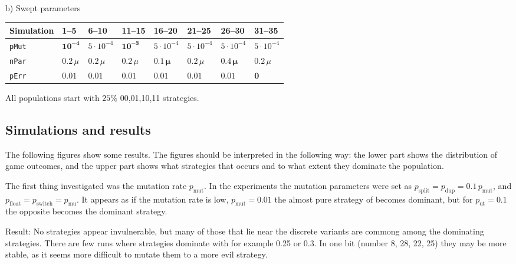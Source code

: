 \begin{table}[!hbtp]
  b) Swept parameters\myhalfpar

  \newcommand \temp {$5\cdot 10^{-4}$}
  \begin{tabular}{*{8}{l}}
    Simulation    & 1--5               & 6--10    & 11--15    & 16--20   & 21--25   & 26--30   & 31--35   \\
    \hline
    \texttt{pMut} & $\mathbf{10^{-4}}$ & \temp       & $\mathbf{10^{-3}}$ & \temp       & \temp       & \temp       & \temp       \\
    \texttt{nPar} & $0.2\,\mu$          & $0.2\,\mu$ & $0.2\,\mu$  & $\mathbf{0.1\,\mu}$ & $0.2\,\mu$ & $\mathbf{0.4\,\mu}$ & $0.2\,\mu$ \\
    \texttt{pErr} & $0.01$             & $0.01$   & $0.01$    & $0.01$   & $0.01$   & $0.01$   & $\mathbf{0}$ 
  \end{tabular}
\end{table}

All populations start with $25 \%$ 00,01,10,11 strategies.  %

\subsection{Simulations and results}
The following figures show some results. The figures should be interpreted in the following way: the lower part shows the distribution of game outcomes, and the upper part shows what strategies that occurs and to what extent they dominate the population.

The first thing investigated was the mutation rate $p_{\textrm{mut}}$. In the experiments the mutation parameters were set as $p_{\textrm{split}} = p_{\textrm{dup}} = 0.1\,p_{\textrm{mut}}$, and$ p_{\textrm{float}} = p_{\textrm{switch}} = p_{\textrm{mu}}$. It appears as if the mutation rate is low, $p_{\textrm{mut}}=0.01$ the almost pure strategy of  becomes dominant, but for $p_{\textrm{ut}}=0.1$ the opposite  becomes the dominant strategy.

Result: No strategies appear invulnerable, but many of those that lie near the discrete variants are commong among the dominating strategies. There are few runs where strategies dominate with for example 0.25 or 0.3. In one bit (number 8, 28, 22, 25) they may be more stable, as it seems more difficult to mutate them to a more evil strategy. 

